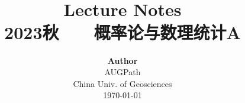 \title{ \normalsize \textsc{}
		\\ [2.0cm]
		\HRule{1.5pt} \\
		\LARGE \textbf{{Lecture Notes}
		\HRule{2.0pt} \\ [0.6cm] \LARGE{2023秋 ~~~概率论与数理统计A} \vspace*{10\baselineskip}}
		}
\date{}
\author{\textbf{Author} \\ 
		AUGPath \\
		China Univ. of Geosciences \\
		\today}

\maketitle
\newpage
\setcounter{tocdepth}{1}
\tableofcontents
\newpage
